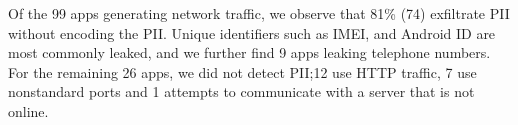 Of the 99 apps generating network traffic, we observe that 81\% (74) exfiltrate PII without encoding the PII. 
Unique identifiers such as IMEI, and Android ID are most commonly leaked, and we further find 9 apps leaking telephone numbers. 
For the remaining 26 apps, we did not detect PII;12 use HTTP traffic, 7 use nonstandard ports and 1 attempts to communicate with a server that is not online. 


%
